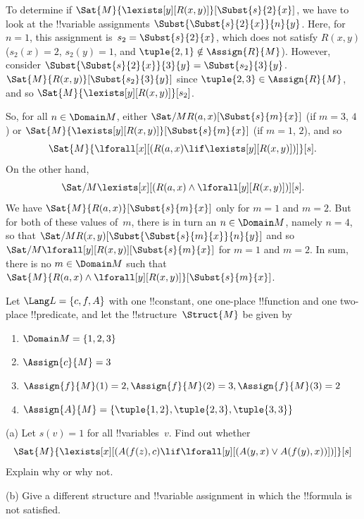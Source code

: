 \begin{ex}
To determine if $\Sat{M}{\lexists[y][R(x,y)]}[\Subst{s}{2}{x}]$, we
have to look at the !!{variable} assignments
$\Subst{\Subst{s}{2}{x}}{n}{y}$. Here, for $n = 1$, this assignment
is~$s_2 = \Subst{s}{2}{x}$, which does not satisfy $R(x,y)$ ($s_2(x) =
2$, $s_2(y) = 1$, and $\tuple{2,1}\notin \Assign{R}{M}$). However,
consider $\Subst{\Subst{s}{2}{x}}{3}{y} = \Subst{s_2}{3}{y}$.
$\Sat{M}{R(x,y)}[\Subst{s_2}{3}{y}]$ since $\tuple{2,3} \in
\Assign{R}{M}$, and so $\Sat{M}{\lexists[y][R(x,y)]}[s_2]$.

So, for all $n \in \Domain M$, either
$\Sat/{M}{R(a,x)}[\Subst{s}{m}{x}]$ (if $m = 3$, $4$) or
$\Sat{M}{\lexists[y][R(x,y)]}[\Subst{s}{m}{x}]$ (if $m = 1$, $2$), and so
\[
\Sat{M}{\lforall[x][(R(a,x) \lif \lexists[y][R(x,y)])]}[s].
\]
On the other hand,
\[
\Sat/{M}{\lexists[x][(R(a,x) \land \lforall[y][R(x,y)])]}[s].
\]
We have $\Sat{M}{R(a,x)}[\Subst{s}{m}{x}]$ only for $m = 1$ and $m =
2$. But for both of these values of~$m$, there is in turn an $n \in
\Domain M$, namely $n = 4$, so that
$\Sat/{M}{R(x,y)}[\Subst{\Subst{s}{m}{x}}{n}{y}]$ and so
$\Sat/{M}{\lforall[y][R(x,y)]}[\Subst{s}{m}{x}]$ for $m = 1$ and $m =
2$. In sum, there is no $m \in \Domain M$ such that $\Sat{M}{R(a,x)
\land \lforall[y][R(x,y)]}[\Subst{s}{m}{x}]$.
\end{ex}









\begin{prob}
Let $\Lang L = \{c, f, A\}$ with one !!{constant}, one one-place
!!{function} and one two-place !!{predicate}, and let the
!!{structure}~$\Struct{M}$ be given by
\begin{enumerate}
\item $\Domain M = \{1, 2, 3\}$
\item $\Assign{c}{M} = 3$
\item $\Assign{f}{M}(1) = 2, \Assign{f}{M}(2) = 3, \Assign{f}{M}(3) = 2$
\item $\Assign{A}{M} = \{\tuple{1, 2}, \tuple{2, 3}, \tuple{3, 3}\}$
\end{enumerate}
(a) Let $s(v) = 1$ for all !!{variable}s~$v$.  Find out whether
\[
\Sat{M}{\lexists[x][(A(f(z), c) \lif \lforall[y][(A(y, x) \lor A(f(y),
      x))])]}[s]
\]
Explain why or why not.

(b) Give a different structure and !!{variable} assignment in which the
!!{formula} is not satisfied.
\end{prob}






